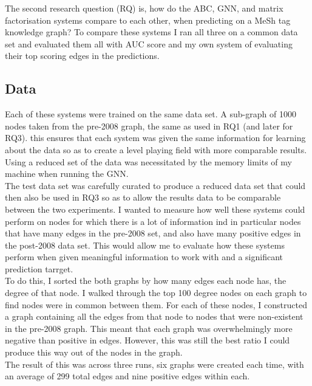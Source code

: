 \documentclass{l4proj}
\begin{document}
The second research question (RQ) is, how do the ABC, GNN, and matrix factorisation systems compare to each other, when predicting on a MeSh tag knowledge graph? To compare these systems I ran all three on a common data set and evaluated them all with AUC score and my own system of evaluating their top scoring edges in the predictions. \\

\subsection{Data}

Each of these systems were trained on the same data set. A sub-graph of 1000 nodes taken from the pre-2008 graph, the same as used in RQ1 (and later for RQ3). this ensures that each system was given the same information for learning about the data so as to create a level playing field with more comparable results. Using a reduced set of the data was necessitated by the memory limits of my machine when running the GNN. \\

The test data set was carefully curated to produce a reduced data set that could then also be used in RQ3 so as to allow the results data to be comparable between the two experiments. I wanted to measure how well these systems could perform on nodes for which there is a lot of information ind in particular nodes that have many edges in the pre-2008 set, and also have many positive edges in the post-2008 data set. This would allow me to evaluate how these systems perform when given meaningful information to work with and a significant prediction tarrget. \\

To do this, I sorted the both graphs by how many edges each node has, the degree of that node. I walked through the top 100 degree nodes on each graph to find nodes were in common between them. For each of these nodes, I constructed a graph containing all the edges from that node to nodes that were non-existent in the pre-2008 graph. This meant that each graph was overwhelmingly more negative than positive in edges. However, this was still the best ratio I could produce this way out of the nodes in the graph. \\ 

The result of this was across three runs, six graphs were created each time, with an average of 299 total edges and nine positive edges within each. \\
\end{document}
